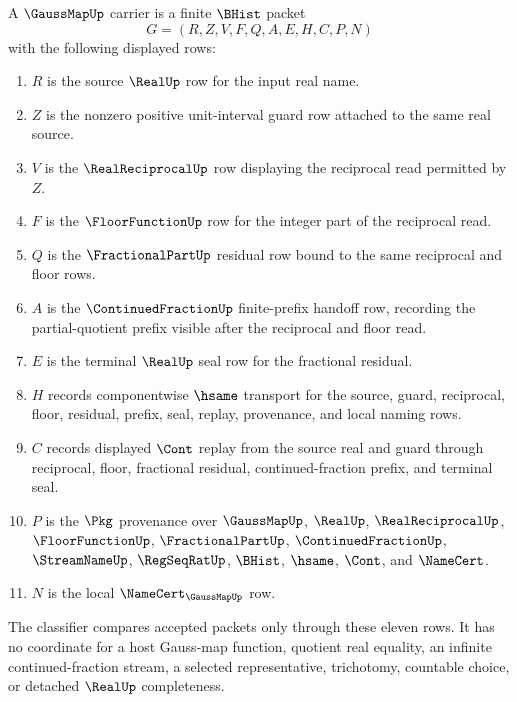 \begin{definition}
\label{def:gauss-map-carrier}
A $\GaussMapUp$ carrier is a finite $\BHist$ packet
$$
G=(R,Z,V,F,Q,A,E,H,C,P,N)
$$
with the following displayed rows:
\begin{enumerate}
\item $R$ is the source $\RealUp$ row for the input real name.
\item $Z$ is the nonzero positive unit-interval guard row attached to the same real source.
\item $V$ is the $\RealReciprocalUp$ row displaying the reciprocal read permitted by $Z$.
\item $F$ is the $\FloorFunctionUp$ row for the integer part of the reciprocal read.
\item $Q$ is the $\FractionalPartUp$ residual row bound to the same reciprocal and floor rows.
\item $A$ is the $\ContinuedFractionUp$ finite-prefix handoff row, recording the partial-quotient prefix visible after the reciprocal and floor read.
\item $E$ is the terminal $\RealUp$ seal row for the fractional residual.
\item $H$ records componentwise $\hsame$ transport for the source, guard, reciprocal, floor, residual, prefix, seal, replay, provenance, and local naming rows.
\item $C$ records displayed $\Cont$ replay from the source real and guard through reciprocal, floor, fractional residual, continued-fraction prefix, and terminal seal.
\item $P$ is the $\Pkg$ provenance over $\GaussMapUp$, $\RealUp$, $\RealReciprocalUp$, $\FloorFunctionUp$, $\FractionalPartUp$, $\ContinuedFractionUp$, $\StreamNameUp$, $\RegSeqRatUp$, $\BHist$, $\hsame$, $\Cont$, and $\NameCert$.
\item $N$ is the local $\NameCert_{\GaussMapUp}$ row.
\end{enumerate}
The classifier compares accepted packets only through these eleven rows. It has no coordinate for a host Gauss-map function, quotient real equality, an infinite continued-fraction stream, a selected representative, trichotomy, countable choice, or detached $\RealUp$ completeness.
\end{definition}

